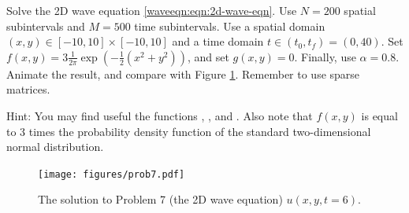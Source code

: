 \begin{problem}
\label{waveeqn:prob:2d-wave-eqn}
Solve the 2D wave equation \eqref{waveeqn:eqn:2d-wave-eqn}.
Use $N = 200$ spatial subintervals and $M = 500$ time subintervals.
Use a spatial domain $(x, y) \in [-10, 10] \times [-10, 10]$ and a time domain $t \in (t_0, t_f) = (0, 40)$.
Set $f(x, y) = 3 \frac 1 {2 \pi} \exp \left(-\frac12 \left(x^2 + y^2
\right) \right)$, and set $g(x, y) = 0$.
Finally, use $\alpha = 0.8$.
Animate the result, and compare with Figure \ref{waveeqn:fig:prob7}.
Remember to use sparse matrices.

Hint: You may find useful the functions , \mbox{,} and .
Also note that $f(x, y)$ is equal to 3 times the probability density function of the standard two-dimensional normal distribution.
\end{problem}

\begin{figure}[H]
	\centering
	\texttt{[image: figures/prob7.pdf]}
	\caption{The solution to Problem 7 (the 2D wave equation) $u(x, y, t=6)$.}
	\label{waveeqn:fig:prob7}
\end{figure}